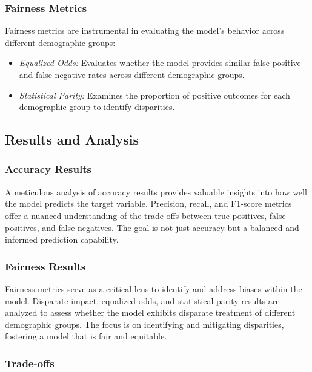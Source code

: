 \subsubsection{Fairness Metrics}

Fairness metrics are instrumental in evaluating the model's behavior across different demographic groups:

\begin{itemize}
    
    \item \emph{Equalized Odds:} Evaluates whether the model provides similar false positive and false negative rates across different demographic groups.
    
    \item \emph{Statistical Parity:} Examines the proportion of positive outcomes for each demographic group to identify disparities.
\end{itemize}

\subsection{Results and Analysis}

\subsubsection{Accuracy Results}

A meticulous analysis of accuracy results provides valuable insights into how well the model predicts the target variable. Precision, recall, and F1-score metrics offer a nuanced understanding of the trade-offs between true positives, false positives, and false negatives. The goal is not just accuracy but a balanced and informed prediction capability.

\subsubsection{Fairness Results}

Fairness metrics serve as a critical lens to identify and address biases within the model. Disparate impact, equalized odds, and statistical parity results are analyzed to assess whether the model exhibits disparate treatment of different demographic groups. The focus is on identifying and mitigating disparities, fostering a model that is fair and equitable.

\subsubsection{Trade-offs}

